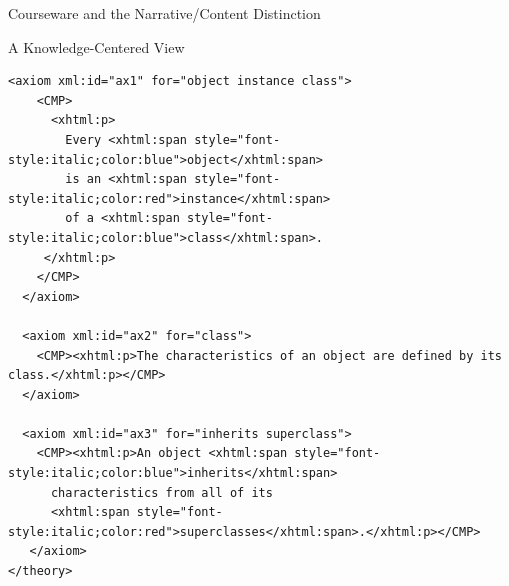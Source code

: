 \begin{tchapter}[id=courseware]{Courseware and the Narrative/Content Distinction}
\begin{tsection}[id=knowledge-centered]{A Knowledge-Centered View}
\begin{lstlisting}[label=lst:ann-oo,
    caption={The {\omdoc} Representation for Slide 2 from {\myfigref{15-211}}},
    index={theory,axiom,symbol,CMP,FMP,OMA,OMOBJ,OMS}]
  <axiom xml:id="ax1" for="object instance class">
    <CMP>
      <xhtml:p>
        Every <xhtml:span style="font-style:italic;color:blue">object</xhtml:span>
        is an <xhtml:span style="font-style:italic;color:red">instance</xhtml:span> 
        of a <xhtml:span style="font-style:italic;color:blue">class</xhtml:span>.
     </xhtml:p>
    </CMP>
  </axiom>

  <axiom xml:id="ax2" for="class">
    <CMP><xhtml:p>The characteristics of an object are defined by its class.</xhtml:p></CMP>
  </axiom>

  <axiom xml:id="ax3" for="inherits superclass">
    <CMP><xhtml:p>An object <xhtml:span style="font-style:italic;color:blue">inherits</xhtml:span>
      characteristics from all of its 
      <xhtml:span style="font-style:italic;color:red">superclasses</xhtml:span>.</xhtml:p></CMP>
   </axiom>
</theory>
\end{lstlisting}


\end{tsection}
\end{tchapter}
